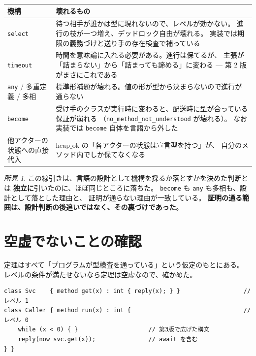 \documentclass[11pt,a4paper]{ltjsarticle}
\theoremstyle{definition}
\theoremstyle{remark}
\newtheorem{finding}[theorem]{所見}
\newcommand{\heapok}{\mathrm{heap\_ok}}
\begin{document}
\begin{center}
\small
\begin{tabular}{@{}lp{8.6cm}@{}}
\toprule
機構 & 壊れるもの \\
\midrule
\texttt{select} &
  待つ相手が誰かは型に現れないので、レベルが効かない。
  進行の枝が一つ増え、デッドロック自由が壊れる。
  実装では期限の義務づけと送り手の存在検査で補っている \\
\texttt{timeout} &
  時間を意味論に入れる必要がある。進行は保てるが、
  主張が「詰まらない」から「詰まっても諦める」に変わる ---
  第 2 版がまさにこれである \\
\texttt{any} / 多重定義 / 多相 &
  標準形補題が壊れる。値の形が型から決まらないので進行が通らない \\
\texttt{become} &
  受け手のクラスが実行時に変わると、配送時に型が合っている保証が崩れる
  （\texttt{no\_method\_not\_understood} が壊れる）。
  なお実装では \texttt{become} 自体を言語から外した \\
他アクターの状態への直接代入 &
  $\heapok$ の「各アクターの状態は宣言型を持つ」が、
  自分のメソッド内でしか保てなくなる \\
\bottomrule
\end{tabular}
\end{center}

\begin{finding}
この線引きは、言語の設計として機構を採るか落とすかを決めた判断とは
\textbf{独立に}引いたのに、ほぼ同じところに落ちた。
\texttt{become} も \texttt{any} も多相も、設計として落とした理由と、
証明が通らない理由が一致している。
\textbf{証明の通る範囲は、設計判断の後追いではなく、その裏づけであった}。
\end{finding}

\section{空虚でないことの確認}
\label{sec:nonvacuous}

定理はすべて「プログラムが型検査を通っている」という仮定のもとにある。
レベルの条件が満たせないなら定理は空虚なので、確かめた。

\begin{lstlisting}[language=AIPL]
class Svc    { method get(x) : int { reply(x); } }                  // レベル 1
class Caller { method run(x) : int {                                // レベル 0
    while (x < 0) { }                    // 第3版で広げた構文
    reply(now svc.get(x));               // await を含む
} }
\end{lstlisting}
\end{document}

